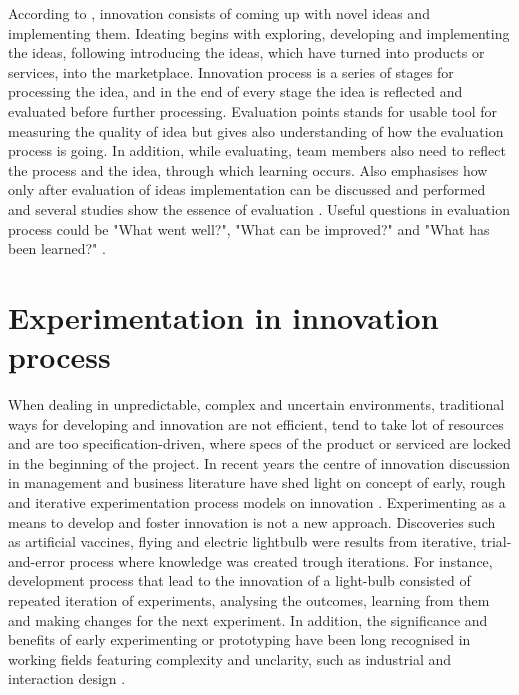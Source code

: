 According to \citet{buijs2007innovation}, innovation consists of coming up with novel ideas and implementing them. Ideating begins with exploring, developing and implementing the ideas, following introducing the ideas, which have turned into products or services, into the marketplace. Innovation process is a series of stages for processing the idea, and in the end of every stage the idea is reflected and evaluated before further processing. Evaluation points stands for usable tool for measuring the quality of idea but gives also understanding of how the evaluation process is going. In addition, while evaluating, team members also need to reflect the process and the idea, through which learning occurs. Also \citep{runco1994problem} emphasises how only after evaluation of ideas implementation can be discussed and performed and several studies show the essence of evaluation \citep{mumford2002leading,vincent2002divergent}. Useful questions in evaluation process could be "What went well?", "What can be improved?" and "What has been learned?" \citep{buijs2007innovation}. 

\section{Experimentation in innovation process}
When dealing in unpredictable, complex and uncertain environments, traditional ways for developing and innovation are not efficient, tend to take lot of resources and are too specification-driven, where specs of the product or serviced are locked in the beginning of the project. In recent years the centre of innovation discussion in management and business literature have shed light on concept of early, rough and iterative experimentation process models on innovation \citep{thomke1998managing,tuulenmaki2011art}. Experimenting as a means to develop and foster innovation is not a new approach. Discoveries such as artificial vaccines, flying and electric lightbulb were results from iterative, trial-and-error process where knowledge was created trough iterations. \citep{thomke2003r} For instance, development process that lead to the innovation of a light-bulb consisted of repeated iteration of experiments, analysing the outcomes, learning from them and making changes for the next experiment. \citep{thomke2001enlightened} In addition, the significance and benefits of early experimenting or prototyping have been long recognised in working fields featuring complexity and unclarity, such as industrial and interaction design \citep{blomkvist2011conceptualising}. 

